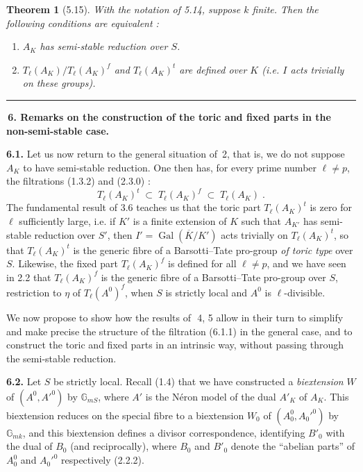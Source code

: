 \documentclass[11pt]{article}
\theoremstyle{plain}
\newtheorem{theoreme}[theorem]{Theorem}
\theoremstyle{definition}
\theoremstyle{remark}
\newcommand{\GG}{\mathbb G}
\DeclareMathOperator{\Gal}{Gal}
\newcommand{\Tl}{T_\ell}
\providecommand{\S}{\mathcal{S}}
\begin{document}
\begin{theoreme}[5.15]
With the notation of \emph{5.14}, suppose $k$ finite. Then the
following conditions are equivalent :
\begin{enumerate}[label=\emph{(\roman*)}]
\item $A_K$ has \emph{semi-stable reduction} over $S$.
\item $\Tl(A_K)/\Tl(A_K)^f$ and $\Tl(A_K)^t$ are defined over $K$
(i.e. $I$ acts trivially on these groups).
\end{enumerate}
\end{theoreme}

\newpage
\hrule
\medskip

\noindent\textbf{\large \S\,6. Remarks on the construction of the toric
and fixed parts in the non-semi-stable case.}

\smallskip

\noindent\textbf{6.1.} Let us now return to the general situation of
\S\,2, that is, we do not suppose $A_K$ to have semi-stable reduction.
One then has, for every prime number $\ell \neq p$, the filtrations
(1.3.2) and (2.3.0) :
\begin{equation}
\Tl(A_K)^t \;\subset\; \Tl(A_K)^f \;\subset\; \Tl(A_K) \; .
\end{equation}
The fundamental result of 3.6 teaches us that the toric part
$\Tl(A_K)^t$ is zero for $\ell$ sufficiently large, i.e. if $K'$ is a
finite extension of $K$ such that $A_{K'}$ has semi-stable reduction
over $S'$, then $I' = \Gal(\overline{K}/K')$ acts trivially on
$\Tl(A_K)^t$, so that $\Tl(A_K)^t$ is the generic fibre of a
Barsotti--Tate pro-group \emph{of toric type} over $S$. Likewise, the
fixed part $\Tl(A_K)^f$ is defined for all $\ell \neq p$, and we have
seen in 2.2 that $\Tl(A_K)^f$ is the generic fibre of a Barsotti--Tate
pro-group over $S$, restriction to $\eta$ of $\Tl(A^0)^f$, when $S$ is
strictly local and $A^0$ is $\ell$-divisible.

\smallskip

We now propose to show how the results of \S\,\S\,4, 5 allow in their
turn to simplify and make precise the structure of the filtration
(6.1.1) in the general case, and to construct the toric and fixed
parts in an intrinsic way, without passing through the semi-stable
reduction.

\medskip

\noindent\textbf{6.2.} Let $S$ be strictly local. Recall (1.4) that we
have constructed a \emph{biextension} $W$ of $(A^0, A'^0)$ by
$\GG_{mS}$, where $A'$ is the N\'eron model of the dual $A'_K$ of
$A_K$. This biextension reduces on the special fibre to a biextension
$W_0$ of $(A_0^0, A_0'^0)$ by $\GG_{mk}$, and this biextension defines a
divisor correspondence, identifying $B'_0$ with the dual of $B_0$ (and
reciprocally), where $B_0$ and $B'_0$ denote the ``abelian parts'' of
$A_0^0$ and $A_0'^0$ respectively (2.2.2).
\end{document}
